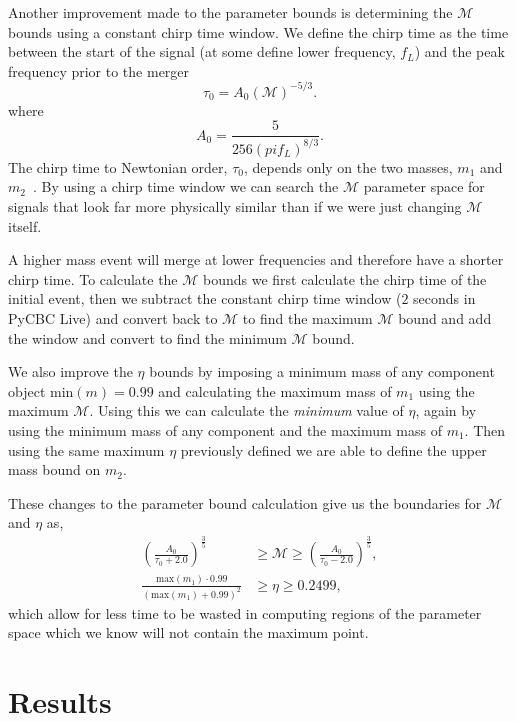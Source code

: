 Another improvement made to the parameter bounds is determining the $\mathcal{M}$ bounds using a constant chirp time window. We define the chirp time as the time between the start of the signal (at some define lower frequency, $f_{L}$) and the peak frequency prior to the merger
%
\begin{equation}
    \tau_0 = A_{0}\left(\mathcal{M}\right)^{-5/3}.
\end{equation}
%
where
%
\begin{equation}
    A_{0} = \frac{5}{256 \left(pi f_{L}\right)^{8/3}}.
\end{equation}
%
The chirp time to Newtonian order, $\tau_{0}$, depends only on the two masses, $m_{1}$ and $m_{2}$~\cite{Cokelaer:2007}. By using a chirp time window we can search the $\mathcal{M}$ parameter space for signals that look far more physically similar than if we were just changing $\mathcal{M}$ itself.

A higher mass \gwadj event will merge at lower frequencies and therefore have a shorter chirp time. To calculate the $\mathcal{M}$ bounds we first calculate the chirp time of the initial event, then we subtract the constant chirp time window ($2$ seconds in PyCBC Live) and convert back to $\mathcal{M}$ to find the maximum $\mathcal{M}$ bound and add the window and convert to find the minimum $\mathcal{M}$ bound.

We also improve the $\eta$ bounds by imposing a minimum mass of any component object $\text{min}(m) = 0.99$ and calculating the maximum mass of $m_{1}$ using the maximum $\mathcal{M}$. Using this we can calculate the \textit{minimum} value of $\eta$, again by using the minimum mass of any component and the maximum mass of $m_{1}$. Then using the same maximum $\eta$ previously defined we are able to define the upper mass bound on $m_{2}$.

These changes to the parameter bound calculation give us the boundaries for $\mathcal{M}$ and $\eta$ as,
%
\begin{align}
    \left(\frac{A_{0}}{\tau_{0} + 2.0}\right)^{\frac{3}{5}} &\ge \mathcal{M} \ge \left(\frac{A_{0}}{\tau_{0} - 2.0}\right)^{\frac{3}{5}}, \\[10pt]
    \frac{\text{max}(m_{1}) \cdot 0.99}{(\text{max}(m_{1}) + 0.99)^{2}} &\ge \eta \ge 0.2499,
\end{align}
%
which allow for less time to be wasted in computing regions of the parameter space which we know will not contain the maximum point.

\section{\label{7:sec:results}Results}

